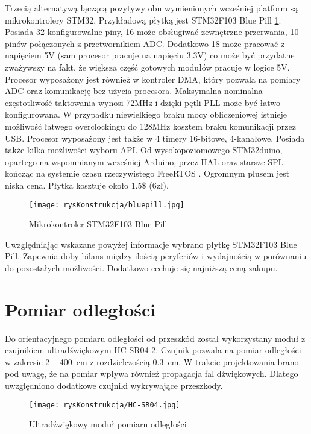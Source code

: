 	Trzecią alternatywą łączącą pozytywy obu wymienionych wcześniej platform są mikrokontrolery STM32. Przykładową płytką jest STM32F103 Blue Pill \ref{fig:bluepillPlytka}. Posiada 32 konfigurowalne piny, 16 może obsługiwać zewnętrzne przerwania, 10 pinów połączonych z przetwornikiem ADC. Dodatkowo 18 może pracować z napięciem 5V (sam procesor pracuje na napięciu 3.3V) co może być przydatne zważywszy na fakt, że większa część gotowych modułów pracuje w logice 5V. Procesor wyposażony jest również w kontroler DMA, który pozwala na pomiary ADC oraz komunikację bez użycia procesora. Maksymalna nominalna częstotliwość taktowania wynosi 72MHz i dzięki pętli PLL może być łatwo konfigurowana. W przypadku niewielkiego braku mocy obliczeniowej istnieje możliwość łatwego overclockingu do 128MHz kosztem braku komunikacji przez USB. Procesor wyposażony jest także w 4 timery 16-bitowe, 4-kanałowe. Posiada także kilka możliwości wyboru API. Od wysokopoziomowego STM32duino, opartego na wspomnianym wcześniej Arduino, przez HAL oraz starsze SPL kończąc na systemie czasu rzeczywistego FreeRTOS \cite{FreeRTOS}. Ogromnym plusem jest niska cena. Płytka kosztuje około 1.5\$ (6zł).

	\begin{figure}[h]
		\centering
		\texttt{[image: rysKonstrukcja/bluepill.jpg]} 
		\caption{Mikrokontroler STM32F103 Blue Pill}
		\label{fig:bluepillPlytka}
	\end{figure}
	
	Uwzględniając wskazane powyżej informacje wybrano płytkę STM32F103 Blue Pill. Zapewnia doby bilans między ilością peryferiów i wydajnością w porównaniu do pozostałych możliwości. Dodatkowo cechuje się najniższą ceną zakupu.
	
	\section{Pomiar odległości}
	
	Do orientacyjnego pomiaru odległości od przeszkód został wykorzystany moduł z czujnikiem ultradźwiękowym HC-SR04 \ref{fig:HCSR04}. Czujnik pozwala na pomiar odległości w zakresie \SI{2}{} --  \SI{400}{\centi\meter} z rozdzielczością \SI{0.3}{\centi\meter}. W trakcie projektowania brano pod uwagę, że na pomiar wpływa również propagacja fal dźwiękowych. Dlatego uwzględniono dodatkowe czujniki wykrywające przeszkody.
	
	\begin{figure}[H]
		\centering
		\texttt{[image: rysKonstrukcja/HC-SR04.jpg]} 
		\caption{Ultradźwiękowy moduł pomiaru odległości}
		\label{fig:HCSR04}
	\end{figure}

